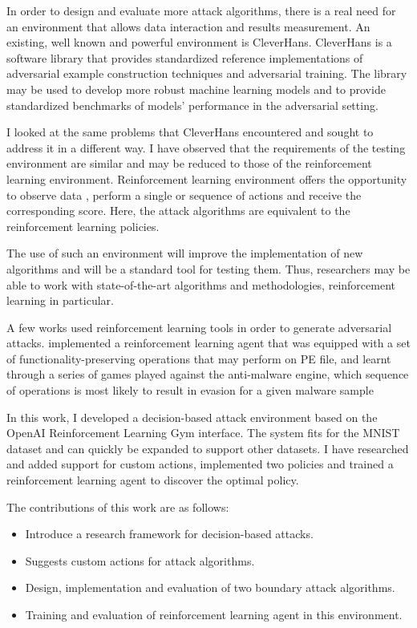 \documentclass{article}
\begin{document}
In order to design and evaluate more attack algorithms, there is a real need for an environment that allows data interaction and results measurement. An existing, well known and powerful environment is CleverHans. CleverHans \cite{papernot2018cleverhans} is a software library that provides standardized reference implementations of adversarial example construction techniques and adversarial training. The library may be used to develop more robust machine learning models and to provide standardized benchmarks of models' performance in the adversarial setting. 

I looked at the same problems that CleverHans encountered and sought to address it in a different way. I have observed that the requirements of the testing environment are similar and may be reduced to those of the reinforcement learning environment.
Reinforcement learning environment offers the opportunity to observe data , perform a single or sequence of actions and receive the corresponding score. Here, the attack algorithms are equivalent to the reinforcement learning policies.

The use of such an environment will improve the implementation of new algorithms and will be a standard tool for testing them. Thus, researchers may be able to work with state-of-the-art algorithms and methodologies, reinforcement learning in particular.

A few works used reinforcement learning tools in order to generate adversarial attacks. \cite{hyrum2017evading} implemented a reinforcement learning agent that was equipped with a set of functionality-preserving operations that  may perform on PE file, and learnt through a series of games played against the anti-malware engine, which
sequence of operations is most likely to result in evasion for a given malware sample

In this work, I developed a decision-based attack environment based on the OpenAI Reinforcement Learning Gym \cite{brockman2016openai} interface. The system fits for the MNIST dataset \cite{mnist10027939599} and can quickly be expanded to support other datasets. I have researched and added support for custom actions, implemented two policies and trained a reinforcement learning agent to discover the optimal policy.

The contributions of this work are as follows:
\begin{itemize}
\item Introduce a research framework for decision-based attacks. 
\item Suggests custom actions for attack algorithms.
\item Design, implementation and evaluation of two boundary attack algorithms.
\item Training and evaluation of reinforcement learning agent in this environment.
\end{itemize}
\end{document}
